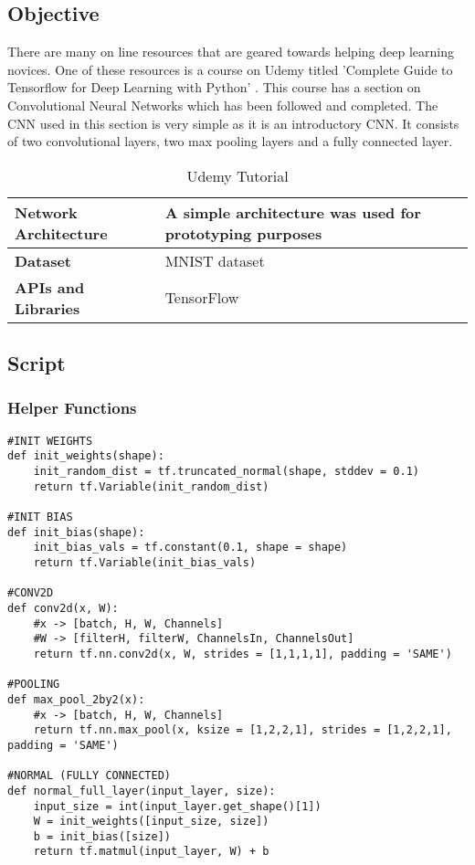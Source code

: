 \tocless\subsection{Objective}
There are many on line resources that are geared towards helping deep learning novices.
One of these resources is a course on Udemy titled 'Complete Guide to Tensorflow for Deep Learning with Python' \parencite{udemy}.
This course has a section on Convolutional Neural Networks which has been followed and completed.
The CNN used in this section is very simple as it is an introductory CNN.
It consists of two convolutional layers, two max pooling layers and a fully connected layer.

\begin{table}[h]
\centering
\caption{Udemy Tutorial}
\label{my-label}
\begin{tabular}{|l|p{8cm}|}
\hline
\textbf{Network Architecture} & A simple architecture was used for prototyping purposes            \\ \hline
\textbf{Dataset}              & MNIST dataset \\ \hline
\textbf{APIs and Libraries}   & TensorFlow                                                         \\ \hline
\end{tabular}
\end{table}

\tocless\subsection{Script}
\tocless\subsubsection{Helper Functions}
\begin{lstlisting}[style=Python]
#INIT WEIGHTS
def init_weights(shape):
    init_random_dist = tf.truncated_normal(shape, stddev = 0.1)
    return tf.Variable(init_random_dist)

#INIT BIAS
def init_bias(shape):
    init_bias_vals = tf.constant(0.1, shape = shape)
    return tf.Variable(init_bias_vals)

#CONV2D
def conv2d(x, W):
    #x -> [batch, H, W, Channels]
    #W -> [filterH, filterW, ChannelsIn, ChannelsOut]
    return tf.nn.conv2d(x, W, strides = [1,1,1,1], padding = 'SAME')

#POOLING
def max_pool_2by2(x):
    #x -> [batch, H, W, Channels]
    return tf.nn.max_pool(x, ksize = [1,2,2,1], strides = [1,2,2,1], padding = 'SAME')

#NORMAL (FULLY CONNECTED)
def normal_full_layer(input_layer, size):
    input_size = int(input_layer.get_shape()[1])
    W = init_weights([input_size, size])
    b = init_bias([size])
    return tf.matmul(input_layer, W) + b
\end{lstlisting}

